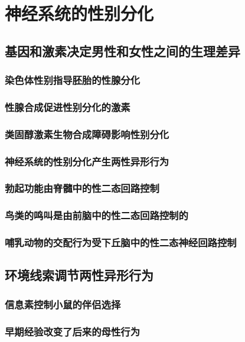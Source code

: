 \chapter{神经系统的性别分化}

\section{基因和激素决定男性和女性之间的生理差异}
\subsection{染色体性别指导胚胎的性腺分化}
\subsection{性腺合成促进性别分化的激素}
\subsection{类固醇激素生物合成障碍影响性别分化}

\subsection{神经系统的性别分化产生两性异形行为}
\subsection{勃起功能由脊髓中的性二态回路控制}
\subsection{鸟类的鸣叫是由前脑中的性二态回路控制的}
\subsection{哺乳动物的交配行为受下丘脑中的性二态神经回路控制}

\section{环境线索调节两性异形行为}
\subsection{信息素控制小鼠的伴侣选择}
\subsection{早期经验改变了后来的母性行为}

